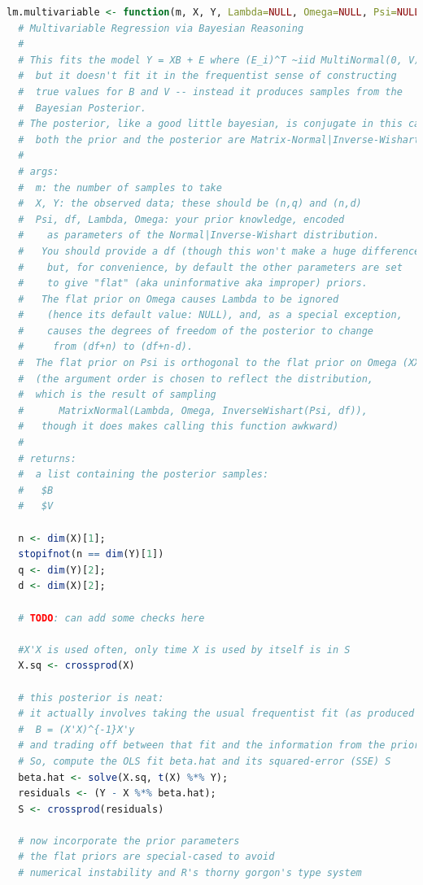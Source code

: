 \documentclass[english]{report}
\begin{document}
\begin{lstlisting}[frame=single, language=R]
lm.multivariable <- function(m, X, Y, Lambda=NULL, Omega=NULL, Psi=NULL, df=71) { # TODO: Not sure what to name this.
  # Multivariable Regression via Bayesian Reasoning
  # 
  # This fits the model Y = XB + E where (E_i)^T ~iid MultiNormal(0, V)
  #  but it doesn't fit it in the frequentist sense of constructing
  #  true values for B and V -- instead it produces samples from the
  #  Bayesian Posterior.
  # The posterior, like a good little bayesian, is conjugate in this case:
  #  both the prior and the posterior are Matrix-Normal|Inverse-Wisharts.
  #
  # args:
  #  m: the number of samples to take
  #  X, Y: the observed data; these should be (n,q) and (n,d)
  #  Psi, df, Lambda, Omega: your prior knowledge, encoded
  #    as parameters of the Normal|Inverse-Wishart distribution.
  #   You should provide a df (though this won't make a huge difference)
  #    but, for convenience, by default the other parameters are set
  #    to give "flat" (aka uninformative aka improper) priors. 
  #   The flat prior on Omega causes Lambda to be ignored
  #    (hence its default value: NULL), and, as a special exception,
  #    causes the degrees of freedom of the posterior to change
  #     from (df+n) to (df+n-d).
  #  The flat prior on Psi is orthogonal to the flat prior on Omega (XXX is this true? surely it has some effect, even if only numerical/speed/something)
  #  (the argument order is chosen to reflect the distribution,
  #  which is the result of sampling
  #      MatrixNormal(Lambda, Omega, InverseWishart(Psi, df)), 
  #   though it does makes calling this function awkward)
  # 
  # returns:
  #  a list containing the posterior samples:
  #   $B
  #   $V
  
  n <- dim(X)[1];
  stopifnot(n == dim(Y)[1])
  q <- dim(Y)[2];
  d <- dim(X)[2];
  
  # TODO: can add some checks here
  
  #X'X is used often, only time X is used by itself is in S
  X.sq <- crossprod(X)
  
  # this posterior is neat:
  # it actually involves taking the usual frequentist fit (as produced by lm())
  #  B = (X'X)^{-1}X'y
  # and trading off between that fit and the information from the prior.
  # So, compute the OLS fit beta.hat and its squared-error (SSE) S 
  beta.hat <- solve(X.sq, t(X) %*% Y);
  residuals <- (Y - X %*% beta.hat);
  S <- crossprod(residuals)
  
  # now incorporate the prior parameters
  # the flat priors are special-cased to avoid
  # numerical instability and R's thorny gorgon's type system
  

\end{lstlisting}
\end{document}
